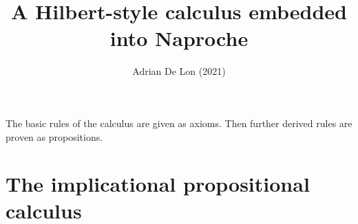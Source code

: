 \documentclass[english]{article}
\title{A Hilbert-style calculus embedded into Naproche}
\author{Adrian De Lon (2021)}
\date{}
\begin{document}

\maketitle

\begin{forthel}
\end{forthel}

The basic rules of the calculus are given as axioms.
Then further derived rules are proven as propositions. 

\section{The implicational propositional calculus}
\end{document}
